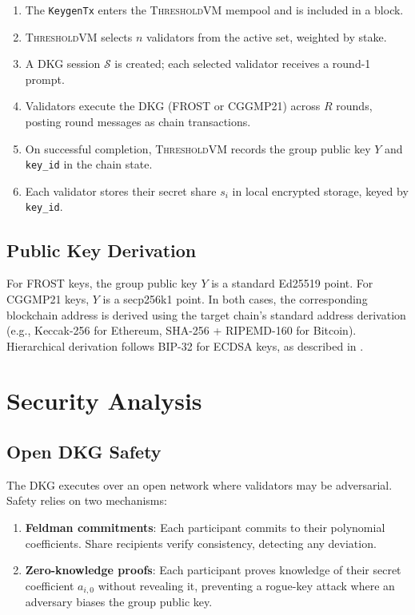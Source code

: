 \documentclass[11pt,letterpaper]{article}
\theoremstyle{definition}
\theoremstyle{remark}
\newcommand{\ThresholdVM}{\textsc{ThresholdVM}}
\begin{document}
\begin{enumerate}
\item The \texttt{KeygenTx} enters the \ThresholdVM{} mempool and is included in a block.
\item \ThresholdVM{} selects $n$ validators from the active set, weighted by stake.
\item A DKG session $\mathcal{S}$ is created; each selected validator receives a round-1 prompt.
\item Validators execute the DKG (FROST or CGGMP21) across $R$ rounds, posting round messages as chain transactions.
\item On successful completion, \ThresholdVM{} records the group public key $Y$ and \texttt{key\_id} in the chain state.
\item Each validator stores their secret share $s_i$ in local encrypted storage, keyed by \texttt{key\_id}.
\end{enumerate}

\subsection{Public Key Derivation}

For FROST keys, the group public key $Y$ is a standard Ed25519 point. For CGGMP21 keys, $Y$ is a secp256k1 point. In both cases, the corresponding blockchain address is derived using the target chain's standard address derivation (e.g., Keccak-256 for Ethereum, SHA-256 + RIPEMD-160 for Bitcoin). Hierarchical derivation follows BIP-32 for ECDSA keys, as described in \cite{zoo-key-management}.

\section{Security Analysis}
\label{sec:security}

\subsection{Open DKG Safety}

The DKG executes over an open network where validators may be adversarial. Safety relies on two mechanisms:

\begin{enumerate}
\item \textbf{Feldman commitments}: Each participant commits to their polynomial coefficients. Share recipients verify consistency, detecting any deviation.
\item \textbf{Zero-knowledge proofs}: Each participant proves knowledge of their secret coefficient $a_{i,0}$ without revealing it, preventing a rogue-key attack where an adversary biases the group public key.
\end{enumerate}
\end{document}
